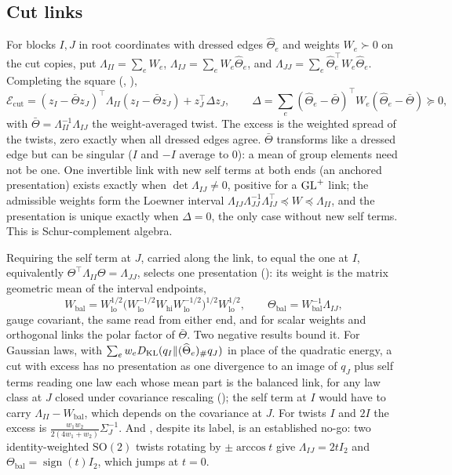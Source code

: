 \subsection{Cut links}

For blocks $I,J$ in root coordinates with dressed edges $\widehat\Theta_e$ and weights $W_e\succ0$ on
the cut copies, put $\Lambda_{II}=\sum_eW_e$, $\Lambda_{IJ}=\sum_eW_e\widehat\Theta_e$, and
$\Lambda_{JJ}=\sum_e\widehat\Theta_e^\top W_e\widehat\Theta_e$. Completing the square
(, ),
\[
\mathcal E_{\mathrm{cut}}=(z_I-\bar\Theta z_J)^\top\Lambda_{II}(z_I-\bar\Theta z_J)+z_J^\top\Delta z_J,
\qquad
\Delta=\sum_e(\widehat\Theta_e-\bar\Theta)^\top W_e(\widehat\Theta_e-\bar\Theta)\succeq0,
\]
with $\bar\Theta=\Lambda_{II}^{-1}\Lambda_{IJ}$ the weight-averaged twist. The excess is the weighted
spread of the twists, zero exactly when all dressed edges agree. $\bar\Theta$ transforms like a dressed
edge but can be singular ($I$ and $-I$ average to $0$): a mean of group elements need not be one. One
invertible link with new self terms at both ends (an anchored presentation) exists exactly when
$\det\Lambda_{IJ}\neq0$, positive for a $\mathrm{GL}^+$ link; the admissible weights form the Loewner interval
$\Lambda_{IJ}\Lambda_{JJ}^{-1}\Lambda_{IJ}^\top\preceq W\preceq\Lambda_{II}$, and the presentation is
unique exactly when $\Delta=0$, the only case without new self terms. This is Schur-complement algebra.

Requiring the self term at $J$, carried along the link, to equal the one at $I$, equivalently
$\Theta^\top\Lambda_{II}\Theta=\Lambda_{JJ}$, selects one presentation
(): its weight is the matrix geometric mean \citep{Bhatia2007} of the
interval endpoints,
\[
W_{\mathrm{bal}}=W_{\mathrm{lo}}^{1/2}\bigl(W_{\mathrm{lo}}^{-1/2}W_{\mathrm{hi}}W_{\mathrm{lo}}^{-1/2}\bigr)^{1/2}W_{\mathrm{lo}}^{1/2},
\qquad
\Theta_{\mathrm{bal}}=W_{\mathrm{bal}}^{-1}\Lambda_{IJ},
\]
gauge covariant, the same read from either end, and for scalar weights and orthogonal links the
polar factor of $\bar\Theta$. Two negative results bound it. For Gaussian laws, with
$\sum_ew_eD_{\mathrm{KL}}(q_I\Vert(\widehat\Theta_e)_\#q_J)$ in place of the quadratic energy, a cut with excess has
no presentation as one divergence to an image of $q_J$ plus self terms reading one law each whose mean
part is the balanced link, for any law class at $J$ closed under covariance rescaling
(); the self term at $I$ would have to carry
$\Lambda_{II}-W_{\mathrm{bal}}$, which depends on the covariance at $J$. For twists $I$ and $2I$ the
excess is $\frac{w_1w_2}{2(4w_1+w_2)}\Sigma_J^{-1}$. And , despite its label,
is an established no-go: two identity-weighted $\mathrm{SO}(2)$ twists rotating by $\pm\arccos t$ give
$\Lambda_{IJ}=2tI_2$ and $\Theta_{\mathrm{bal}}=\operatorname{sign}(t)I_2$, which jumps at $t=0$.

